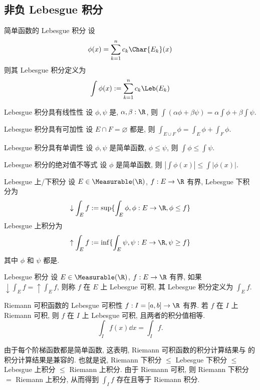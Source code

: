 \subsection{非负 Lebesgue 积分}
\begin{dfn}
    {简单函数的 Lebesgue 积分}
    设 
    \[\phi(x) = \sum_{k=1}^n c_k\Char{E_k}(x)\]
    则其 Lebesgue 积分定义为
    \[\int \phi(x) := \sum_{k=1}^n c_k \Leb(E_k)\]
\end{dfn}
\begin{ppt}
    {Lebesgue 积分具有线性性}
    设 \(\phi,\psi\) 是\SimpleFunc{}, \(\alpha,\beta:\R\), 则 \(\int (\alpha\phi+\beta\psi) = \alpha \int \phi + \beta \int \psi\).
\end{ppt}
\begin{ppt}
    {Lebesgue 积分具有可加性}
    设 $E\cap F=\varnothing$ 都是\MeasurableSet{}, 则 \(\int_{E\cup F} \phi = \int_E \phi + \int_F \phi\).
\end{ppt}
\begin{ppt}
    {Lebesgue 积分具有单调性}
    设 \(\phi,\psi\) 是简单函数, \(\phi\leq\psi\), 则 \(\int \phi \leq \int \psi\).
\end{ppt}
\begin{ppt}
    {Lebesgue 积分的绝对值不等式}
    设 \(\phi\) 是简单函数, 则 \(\left|\int \phi(x)\right| \leq \int |\phi(x)|\).
\end{ppt}
\begin{dfn}
    {Lebesgue 上/下积分}
    设 $E\in\Measurable(\R)$, \(f:E\to\R\) 有界,  Lebesgue 下积分为
    \[\downarrow \int_{E}f:=\sup\{\int_E\phi, \phi:E\to\R, \phi\leq f\}\]
    Lebesgue 上积分为
    \[\uparrow \int_{E}f:=\inf\{\int_E\psi, \psi:E\to\R, \psi\geq f\}\]
    其中 \(\phi\) 和 \(\psi\) 都是\SimpleFunc{}.
\end{dfn}
\begin{dfn}
    {Lebesgue 积分}
    设 $E\in\Measurable(\R)$, \(f:E\to\R\) 有界, 如果 \(\downarrow\int_{E}f=\uparrow\int_{E}f\), 则称 \(f\) 在 \(E\) 上 Lebesgue 可积, 其 Lebesgue 积分定义为 \(\int_E f\).
\end{dfn}
\begin{thm}
    {Riemann 可积函数的 Lebesgue 可积性}
    \(f: I=[a,b]\to\R\) 有界. 若 \(f\) 在 \(I\) 上 Riemann 可积, 则 \(f\) 在 \(I\) 上 Lebesgue 可积, 且两者的积分值相等.
    \[\int_I f(x)\dd{x}=\int_I f.\]
\end{thm}
\begin{prf}
    由于每个阶梯函数都是简单函数, 这表明,  Riemann 可积函数的积分计算结果与 \MeasurableFunc{}的积分计算结果是兼容的. 也就是说,
    Riemann 下积分 \(\leq\) Lebesgue 下积分 \(\leq\) Lebesgue 上积分 \(\leq\) Riemann 上积分. 由于 Riemann 可积, 则 Riemann 下积分 \(=\) Riemann 上积分, 从而得到 \(\int_I f\) 存在且等于 Riemann 积分.
\end{prf}
